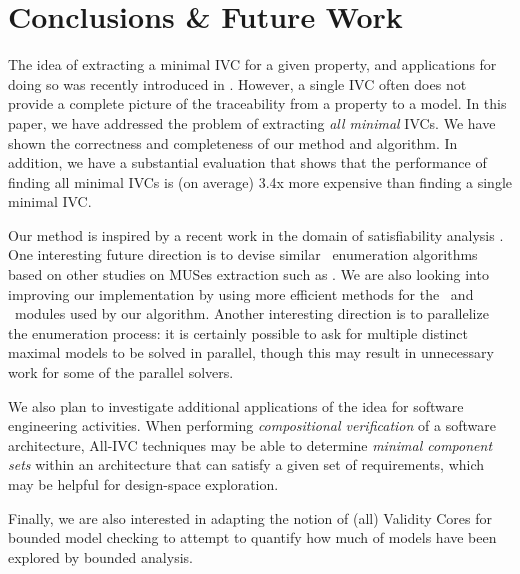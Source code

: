\section{Conclusions \& Future Work}
\label{sec:conc}
The idea of extracting a minimal IVC for a given property, and applications for doing so was recently introduced in \cite{Ghass16}.  However, a single IVC often does not provide a complete picture of the traceability from a property to a model.  In this paper, we have addressed the problem of extracting {\em all minimal} IVCs. We have shown
the correctness and completeness of our method and algorithm.  In addition, we have a substantial evaluation that shows that the performance of finding all minimal IVCs is (on average) 3.4x more expensive than finding a single minimal IVC.

Our method is inspired by a recent work in the domain of satisfiability analysis \cite{marco2016fast}. One interesting future direction is to devise similar \mivc\ enumeration algorithms based on other studies on MUSes extraction such as \cite{Bacchus2016, nadel2014accelerated}.  We are also looking into improving our implementation by using more  efficient methods for the \isadeq ~and \getivc ~modules used by our algorithm. Another interesting direction is to parallelize the enumeration process: it is certainly possible to ask for multiple distinct maximal models to be solved in parallel, though this may result in unnecessary work for some of the parallel solvers.  

We also plan to investigate additional applications of the idea for software engineering activities.  When performing {\em compositional verification} of a software architecture, All-IVC techniques may be able to determine {\em minimal component sets} within an architecture that can satisfy a given set of requirements, which may be helpful for design-space exploration.

Finally, we are also interested in adapting the notion of (all) Validity Cores for bounded model checking to attempt to quantify how much of models have been explored by bounded analysis. 